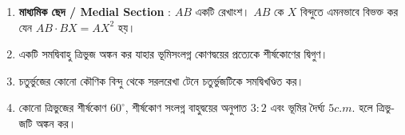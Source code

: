 \documentclass[11pt, a4paper]{article}
\begin{document}
\begin{enumerate}
	\item \textbf{\textbengali{মাধ্যমিক ছেদ} / Medial Section} : $AB$ \textbengali{একটি রেখাংশ।} $AB$ \textbengali{কে}  $X$ \textbengali{বিন্দুতে এমনভাবে বিভক্ত কর যেন} $AB \cdot BX = AX^2$ \textbengali{হয়।}
	
	\item \textbengali{একটি সমদ্বিবাহু ত্রিভুজ অঙ্কন কর যাহার ভূমিসংলগ্ন কোণদ্বয়ের প্রত্যেকে শীর্ষকোণের দ্বিগুণ।}
	
	\item \textbengali{চতুর্ভুজের কোনো কৌণিক বিন্দু থেকে সরলরেখা টেনে চতুর্ভুজটিকে সমদ্বিখণ্ডিত কর।}
	
	\item \textbengali{কোনো ত্রিভুজের শীর্ষকোণ} $60^{\circ}$, \textbengali{শীর্ষকোণ সংলগ্ন বাহুদ্বয়ের অনুপাত} $3:2$ \textbengali{এবং ভূমির দৈর্ঘ্য} $5 c.m.$ \textbengali{হলে ত্রিভুজটি অঙ্কন কর।}

\end{enumerate}
\end{document}

